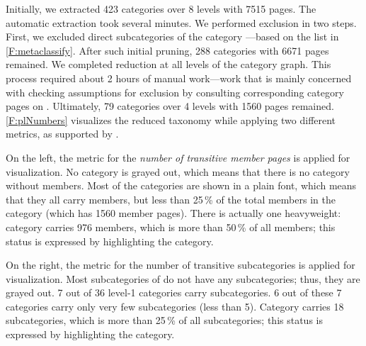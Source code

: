 
Initially, we extracted 423 categories over 8 levels with 7515 pages. The automatic extraction took several minutes. We performed exclusion in two steps. First, we excluded direct subcategories of the category ---based on the list in \autoref{F:metaclassify}. After such initial pruning, 288 categories with 6671 pages remained. We completed reduction at all levels of the category graph. This process required about 2 hours of manual work---work that is mainly concerned with checking assumptions for exclusion by consulting corresponding category pages on \Wikipedia. Ultimately, 79 categories over 4 levels with 1560 pages remained.  \autoref{F:plNumbers} visualizes the reduced taxonomy while applying two different metrics, as supported by \WikiTax.

On the left, the metric for the \emph{number of transitive member pages} is applied for visualization. No category is grayed out, which means that there is no category without members. Most of the categories are shown in a plain font, which means that they all carry members, but less than 25\,\% of the total members in the category  (which has 1560 member pages). There is actually one heavyweight: category  carries 976 members, which is more than 50\,\% of all members; this status is expressed by 
highlighting the category.

On the right, the metric for the number of transitive subcategories is applied for visualization. Most subcategories of  do not have any subcategories; thus, they are grayed out. 7 out of 36 level-1 categories carry subcategories. 6 out of these 7 categories carry only very few subcategories (less than 5). Category  carries 18 subcategories, which is more than 25\,\% of all subcategories; this status is expressed by highlighting the category.

